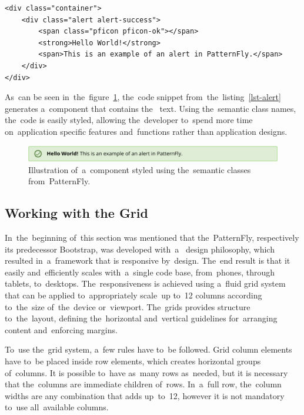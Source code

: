 \begin{lstlisting}[caption=An~example of~styling the~component using predefined
class \textit{.alert}., label=lst-alert, style=dp-html]
<div class="container">
	<div class="alert alert-success">
		<span class="pficon pficon-ok"></span>
		<strong>Hello World!</strong>
		<span>This is an example of an alert in PatternFly.</span>
	</div>
</div>
\end{lstlisting}

As~can be seen in~the~figure~\ref{fig-alert}, the~code snippet
from~the~listing~\ref{lst-alert} generates a~component that contains
the~ text. Using the~semantic class names, the~code is easily
styled, allowing the~developer to~spend more time on~application specific
features and~functions rather than application designs.

\begin{figure}[!hbt]
	\centering
	\includegraphics[scale=0.8]{./figures/patternfly-alert.pdf}
	\caption{Illustration of~a~component styled using the~semantic classes
	from~PatternFly.}
	\label{fig-alert}
\end{figure}

\subsection{Working with the Grid}
In~the~beginning of~this section was mentioned that the~PatternFly, respectively
its predecessor Bootstrap, was developed with~a~ design
philosophy, which resulted in~a~framework that is responsive by~design. The~end
result is that it easily and~efficiently scales with~a~single code base,
from~phones, through tablets, to~desktops. The~responsiveness is achieved using
a~fluid grid system that can be applied to~appropriately scale~up to~12 columns
according to~the~size of~the~device or~viewport. The~grids provides structure
to~the~layout, defining the~horizontal and~vertical guidelines for~arranging
content and~enforcing margins.

To~use the~grid system, a~few rules have to~be followed. Grid column elements
have to~be placed inside row elements, which creates horizontal groups
of~columns. It is possible to~have as~many rows as~needed, but it is necessary
that the~columns are immediate children of~rows. In~a~full row, the~column
widths are any combination that adds up~to~12, however it is not mandatory
to~use all~available columns.

